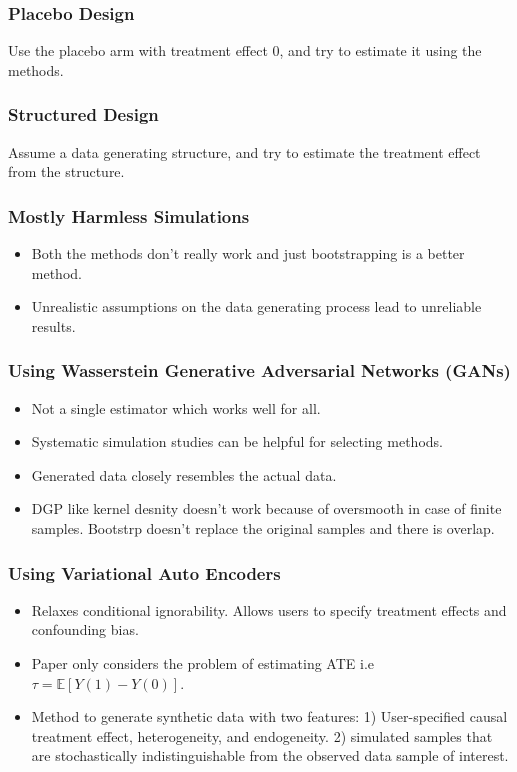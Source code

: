 \documentclass{beamer}
\begin{document}
\begin{frame}
	\frametitle{Placebo Design}
	Use the placebo arm with treatment effect 0, and try to estimate it using the methods.
\end{frame}

\begin{frame}
	\frametitle{Structured Design}
	Assume a data generating structure, and try to estimate the treatment effect from the structure.
\end{frame}

\begin{frame}
	\frametitle{Mostly Harmless Simulations}
	\begin{itemize}
		\item Both the methods don't really work and just bootstrapping is a better method.
		\item Unrealistic assumptions on the data generating process lead to unreliable results.
	\end{itemize}
\end{frame}

\begin{frame}
	\frametitle{Using Wasserstein Generative Adversarial Networks (GANs)}
	\begin{itemize}
		\item Not a single estimator which works well for all.
		\item Systematic simulation studies can be helpful for selecting methods.
		\item Generated data closely resembles the actual data.
		\item DGP like kernel desnity doesn't work because of oversmooth in case of finite samples. Bootstrp doesn't replace the original samples and there is overlap.
	\end{itemize}
\end{frame}

\begin{frame}
	\frametitle{Using Variational Auto Encoders}
	\begin{itemize}
		\item Relaxes conditional ignorability. Allows users to specify treatment effects and confounding bias.
		\item Paper only considers the problem of estimating ATE i.e $ \tau = \mathbb{E}[Y(1) - Y(0)] $.
		\item Method to generate synthetic data with two features: 1) User-specified causal treatment effect, heterogeneity, and endogeneity. 2) simulated samples that are stochastically indistinguishable from the observed data sample of interest.
	\end{itemize}
\end{frame}
\end{document}
